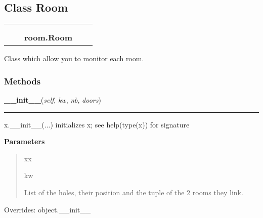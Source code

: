 \subsection{Class Room}

    \label{room:Room}
\begin{tabular}{cccccc}
\multicolumn{2}{r}{\settowidth{\BCL}{object}\multirow{2}{\BCL}{object}}
&&
  \\\cline{3-3}
  &&\multicolumn{1}{c|}{}
&&
  \\
&&\multicolumn{2}{l}{\textbf{room.Room}}
\end{tabular}

Class which allow you to monitor each room.



  \subsubsection{Methods}

    \vspace{0.5ex}

\hspace{.8\funcindent}\begin{boxedminipage}{\funcwidth}

    \raggedright \textbf{\_\_init\_\_}(\textit{self}, \textit{kw}, \textit{nb}, \textit{doors})

    \vspace{-1.5ex}

    \rule{\textwidth}{0.5\fboxrule}
\setlength{\parskip}{2ex}
    x.\_\_init\_\_(...) initializes x; see help(type(x)) for signature

\setlength{\parskip}{1ex}
      \textbf{Parameters}
      \vspace{-1ex}

      \begin{quote}
        \begin{Ventry}{xx}

          \item[kw]

          List of the holes, their position and the tuple of the 2 rooms 
          they link.

        \end{Ventry}

      \end{quote}

      Overrides: object.\_\_init\_\_

    \end{boxedminipage}

